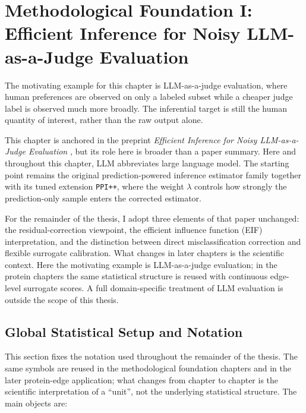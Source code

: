 \chapter{Methodological Foundation I: Efficient Inference for Noisy LLM-as-a-Judge Evaluation} \label{chap:foundation_llm}

The motivating example for this chapter is LLM-as-a-judge evaluation, where human preferences are observed on only a labeled subset while a cheaper judge label is observed much more broadly. The inferential target is still the human quantity of interest, rather than the raw output alone.

This chapter is anchored in the preprint \emph{Efficient Inference for Noisy LLM-as-a-Judge Evaluation} \parencite{llmjudge_eif}, but its role here is broader than a paper summary. Here and throughout this chapter, LLM abbreviates large language model. The starting point remains the original prediction-powered inference estimator family together with its tuned extension \texttt{PPI++}, where the weight \(\lambda\) controls how strongly the prediction-only sample enters the corrected estimator.

For the remainder of the thesis, I adopt three elements of that paper unchanged: the residual-correction viewpoint, the efficient influence function (EIF) interpretation, and the distinction between direct misclassification correction and flexible surrogate calibration. What changes in later chapters is the scientific context. Here the motivating example is LLM-as-a-judge evaluation; in the protein chapters the same statistical structure is reused with continuous edge-level surrogate scores. A full domain-specific treatment of LLM evaluation is outside the scope of this thesis.

\section{Global Statistical Setup and Notation}
\label{sec:global_notation}

This section fixes the notation used throughout the remainder of the thesis. The same symbols are reused in the methodological foundation chapters and in the later protein-edge application; what changes from chapter to chapter is the scientific interpretation of a ``unit'', not the underlying statistical structure. The main objects are:

